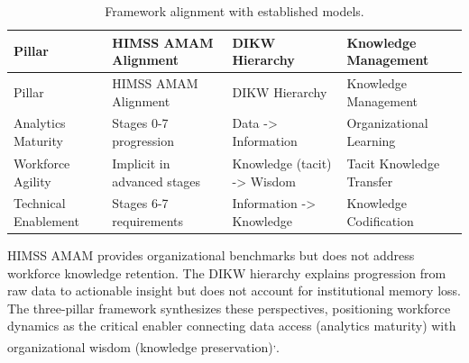 \documentclass[
  american,
  11pt,
  letterpaper,
  oneside  ,captions=tableheading
]{scrartcl}
\begin{document}
\begin{longtable}[]{@{}
  >{\raggedright\arraybackslash}p{}
  >{\raggedright\arraybackslash}p{}
  >{\raggedright\arraybackslash}p{}
  >{\raggedright\arraybackslash}p{}@{}}
\caption{Framework alignment with established models.
\label{tab:alignment}}\tabularnewline
\toprule\noalign{}
\begin{minipage}[b]{\linewidth}\raggedright
Pillar
\end{minipage} & \begin{minipage}[b]{\linewidth}\raggedright
HIMSS AMAM Alignment
\end{minipage} & \begin{minipage}[b]{\linewidth}\raggedright
DIKW Hierarchy
\end{minipage} & \begin{minipage}[b]{\linewidth}\raggedright
Knowledge Management
\end{minipage} \\
\midrule\noalign{}
\endfirsthead
\toprule\noalign{}
\begin{minipage}[b]{\linewidth}\raggedright
Pillar
\end{minipage} & \begin{minipage}[b]{\linewidth}\raggedright
HIMSS AMAM Alignment
\end{minipage} & \begin{minipage}[b]{\linewidth}\raggedright
DIKW Hierarchy
\end{minipage} & \begin{minipage}[b]{\linewidth}\raggedright
Knowledge Management
\end{minipage} \\
\midrule\noalign{}
\endhead
\bottomrule\noalign{}
\endlastfoot
Analytics Maturity & Stages 0-7 progression & Data -\textgreater{}
Information & Organizational Learning \\
Workforce Agility & Implicit in advanced stages & Knowledge (tacit)
-\textgreater{} Wisdom & Tacit Knowledge Transfer \\
Technical Enablement & Stages 6-7 requirements & Information
-\textgreater{} Knowledge & Knowledge Codification \\
\end{longtable}

HIMSS AMAM provides organizational benchmarks but does not address
workforce knowledge retention. The DIKW hierarchy explains progression
from raw data to actionable insight but does not account for
institutional memory loss. The three-pillar framework synthesizes these
perspectives, positioning workforce dynamics as the critical enabler
connecting data access (analytics maturity) with organizational wisdom
(knowledge
preservation)\textsuperscript{,}.
\end{document}
